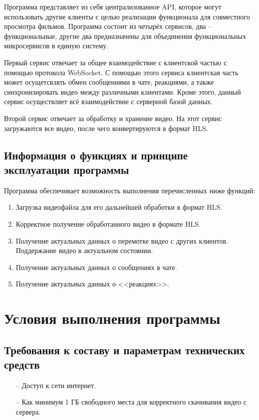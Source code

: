 \documentclass{../includes/TechDoc}
\begin{document}
    Программа представляет из себя централизованное API, которое могут использовать другие клиенты с целью реализации функционала для совместного просмотра фильмов. Программа состоит из четырёх сервисов, два -- функциональные, другие два предназначены для объединения функциональных микросервисов в единую систему.

    Первый сервис отвечает за общее взаимодействие с клиентской частью с помощью протокола WebSocket. С помощью этого сервиса клиентская часть может осущетсвлять обмен сообщениями в чате, реакциями, а также синхронизировать видео между различными клиентами. Кроме этого, данный сервис осуществляет всё взаимодействие с серверной базой данных.

    Второй сервис отвечает за обработку и хранение видео. На этот сервис загружаются все видео, после чего конвертируются в формат HLS.

    \subsection{Информация о функциях и принципе эксплуатации программы}

    Программа обеспечивает возможность выполнения перечисленных ниже функций:
    \begin{enumerate}
        \item Загрузка видеофайла для его дальнейшей обработки в формат HLS.
        \item Корректное получение обработанного видео в формате HLS.
        \item Получение актуальных данных о перемотке видео с других клиентов.
        Поддержание видео в актуальном состоянии.
        \item Получение актуальных данных о сообщениях в чате.
        \item Получение актуальных данных о <<реакциях>>.
    \end{enumerate}

    \section{Условия выполнения программы}

    \subsection{Требования к составу и параметрам технических средств}

    \begin{itemize}
    	\item[--] Доступ к сети интернет.
    	\item[--] Как минимум 1 ГБ свободного места для корректного скачивания видео с сервера.
	\end{itemize}
\end{document}
